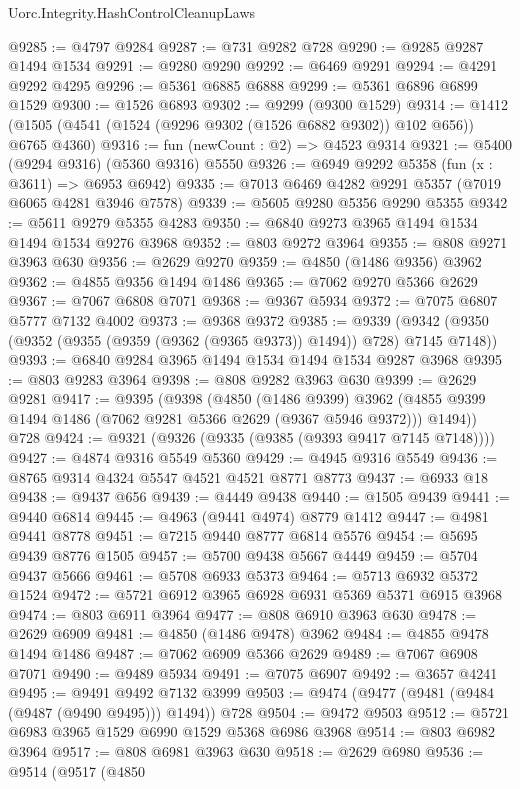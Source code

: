 \begin{lexlean}{Uorc.Integrity.HashControlCleanupLaws}
\begin{coremodule}
@9285 := @4797 @9284
@9287 := @731 @9282 @728
@9290 := @9285 @9287 @1494 @1534
@9291 := @9280 @9290
@9292 := @6469 @9291
@9294 := @4291 @9292 @4295
@9296 := @5361 @6885 @6888
@9299 := @5361 @6896 @6899 @1529
@9300 := @1526 @6893
@9302 := @9299 (@9300 @1529)
@9314 := @1412 (@1505 (@4541 (@1524 (@9296 @9302 (@1526 @6882 @9302)) @102 @656)) @6765 @4360)
@9316 := fun (newCount : @2) => @4523 @9314
@9321 := @5400 (@9294 @9316) (@5360 @9316) @5550
@9326 := @6949 @9292 @5358 (fun (x : @3611) => @6953 @6942)
@9335 := @7013 @6469 @4282 @9291 @5357 (@7019 @6065 @4281 @3946 @7578)
@9339 := @5605 @9280 @5356 @9290 @5355
@9342 := @5611 @9279 @5355 @4283
@9350 := @6840 @9273 @3965 @1494 @1534 @1494 @1534 @9276 @3968
@9352 := @803 @9272 @3964
@9355 := @808 @9271 @3963 @630
@9356 := @2629 @9270
@9359 := @4850 (@1486 @9356) @3962
@9362 := @4855 @9356 @1494 @1486
@9365 := @7062 @9270 @5366 @2629
@9367 := @7067 @6808 @7071
@9368 := @9367 @5934
@9372 := @7075 @6807 @5777 @7132 @4002
@9373 := @9368 @9372
@9385 := @9339 (@9342 (@9350 (@9352 (@9355 (@9359 (@9362 (@9365 @9373)) @1494)) @728) @7145 @7148))
@9393 := @6840 @9284 @3965 @1494 @1534 @1494 @1534 @9287 @3968
@9395 := @803 @9283 @3964
@9398 := @808 @9282 @3963 @630
@9399 := @2629 @9281
@9417 := @9395
    (@9398
      (@4850
        (@1486 @9399)
        @3962
        (@4855 @9399 @1494 @1486 (@7062 @9281 @5366 @2629 (@9367 @5946 @9372)))
        @1494))
    @728
@9424 := @9321 (@9326 (@9335 (@9385 (@9393 @9417 @7145 @7148))))
@9427 := @4874 @9316 @5549 @5360
@9429 := @4945 @9316 @5549
@9436 := @8765 @9314 @4324 @5547 @4521 @4521 @8771 @8773
@9437 := @6933 @18
@9438 := @9437 @656
@9439 := @4449 @9438
@9440 := @1505 @9439
@9441 := @9440 @6814
@9445 := @4963 (@9441 @4974) @8779 @1412
@9447 := @4981 @9441 @8778
@9451 := @7215 @9440 @8777 @6814 @5576
@9454 := @5695 @9439 @8776 @1505
@9457 := @5700 @9438 @5667 @4449
@9459 := @5704 @9437 @5666
@9461 := @5708 @6933 @5373
@9464 := @5713 @6932 @5372 @1524
@9472 := @5721 @6912 @3965 @6928 @6931 @5369 @5371 @6915 @3968
@9474 := @803 @6911 @3964
@9477 := @808 @6910 @3963 @630
@9478 := @2629 @6909
@9481 := @4850 (@1486 @9478) @3962
@9484 := @4855 @9478 @1494 @1486
@9487 := @7062 @6909 @5366 @2629
@9489 := @7067 @6908 @7071
@9490 := @9489 @5934
@9491 := @7075 @6907
@9492 := @3657 @4241
@9495 := @9491 @9492 @7132 @3999
@9503 := @9474 (@9477 (@9481 (@9484 (@9487 (@9490 @9495))) @1494)) @728
@9504 := @9472 @9503
@9512 := @5721 @6983 @3965 @1529 @6990 @1529 @5368 @6986 @3968
@9514 := @803 @6982 @3964
@9517 := @808 @6981 @3963 @630
@9518 := @2629 @6980
@9536 := @9514
    (@9517
      (@4850

\end{coremodule}
\end{lexlean}

